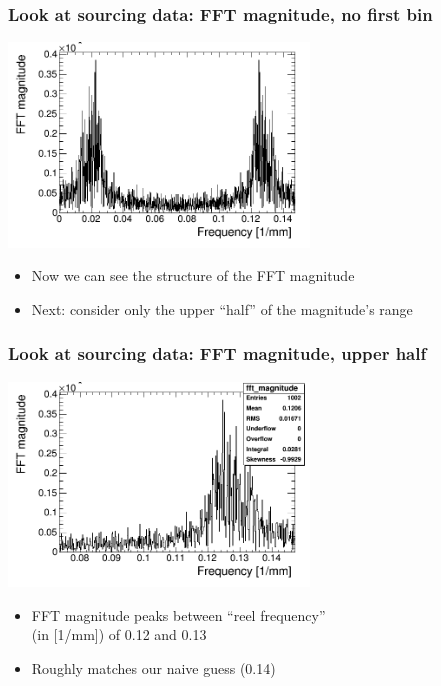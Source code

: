 \documentclass[bigger]{beamer}
\begin{document}
\begin{frame}
\frametitle{Look at sourcing data: FFT magnitude, no first bin}
\label{sec-3-1-7}
\label{sec-3-1-7-1}

\centering
\includegraphics[width=0.6\textwidth]{fig/FFT_magnitude_zeroFirstBin.png}
\begin{itemize}

\item Now we can see the structure of the FFT magnitude
\label{sec-3-1-7-2}%

\item Next: consider only the upper ``half'' of the magnitude's range
\label{sec-3-1-7-3}%
\end{itemize} %
\end{frame}
\begin{frame}
\frametitle{Look at sourcing data: FFT magnitude, upper half}
\label{sec-3-1-8}
\label{sec-3-1-8-1}

\centering
\includegraphics[width=0.6\textwidth]{fig/FFT_magnitude_zeroFirstBin_upperHalf.png}
\begin{itemize}

\item FFT magnitude peaks between ``reel frequency''\\
\label{sec-3-1-8-2}%
(in [1/mm]) of 0.12 and 0.13 

\item Roughly matches our naive guess (0.14)
\label{sec-3-1-8-3}%
\end{itemize} %
\end{frame}
\end{document}
